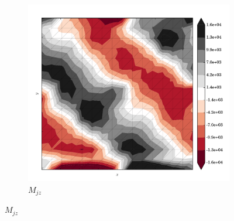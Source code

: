\begin{figure}
  \begin{subfigure}[b]{0.3\linewidth}
    \includegraphics[width=\linewidth]{images/stress_balance/FS/M_jz.pdf}
  \caption{$M_{jz}$}
  \label{fs_M_jz}
  \end{subfigure}


\end{figure}
